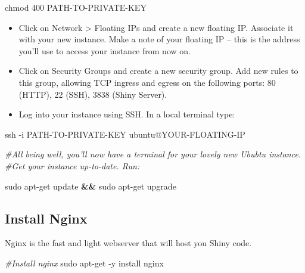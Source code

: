 \documentclass[
]{book}
\newenvironment{Shaded}{\begin{snugshade}}{\end{snugshade}}
\newcommand{\AttributeTok}[1]{\textcolor[rgb]{0.77,0.63,0.00}{#1}}
\newcommand{\CommentTok}[1]{\textcolor[rgb]{0.56,0.35,0.01}{\textit{#1}}}
\newcommand{\FunctionTok}[1]{\textcolor[rgb]{0.00,0.00,0.00}{#1}}
\newcommand{\KeywordTok}[1]{\textcolor[rgb]{0.13,0.29,0.53}{\textbf{#1}}}
\newcommand{\NormalTok}[1]{#1}
\providecommand{\tightlist}{%
  \setlength{\itemsep}{0pt}\setlength{\parskip}{0pt}}
\begin{document}
\begin{Shaded}
\begin{Highlighting}[]
\FunctionTok{chmod}\NormalTok{ 400 PATH{-}TO{-}PRIVATE{-}KEY}
\end{Highlighting}
\end{Shaded}

\begin{itemize}
\tightlist
\item
  Click on Network \textgreater{} Floating IPs and create a new floating IP. Associate it with your new instance. Make a note of your floating IP -- this is the address you'll use to access your instance from now on.
\item
  Click on Security Groups and create a new security group. Add new rules to this group, allowing TCP ingress and egress on the following ports: 80 (HTTP), 22 (SSH), 3838 (Shiny Server).
\item
  Log into your instance using SSH. In a local terminal type:
\end{itemize}

\begin{Shaded}
\begin{Highlighting}[]
\FunctionTok{ssh} \AttributeTok{{-}i}\NormalTok{ PATH{-}TO{-}PRIVATE{-}KEY ubuntu@YOUR{-}FLOATING{-}IP}

\CommentTok{\#All being well, you’ll now have a terminal for your lovely new Ububtu instance.}
\CommentTok{\#Get your instance up{-}to{-}date. Run:}

\FunctionTok{sudo}\NormalTok{ apt{-}get update }\KeywordTok{\&\&} \FunctionTok{sudo}\NormalTok{ apt{-}get upgrade}
\end{Highlighting}
\end{Shaded}

\hypertarget{install-nginx}{%
\subsection{Install Nginx}\label{install-nginx}}

Nginx is the fast and light webserver that will host you Shiny code.

\begin{Shaded}
\begin{Highlighting}[]

\CommentTok{\#Install nginx}
\FunctionTok{sudo}\NormalTok{ apt{-}get }\AttributeTok{{-}y}\NormalTok{ install nginx}
\end{Highlighting}
\end{Shaded}
\end{document}
